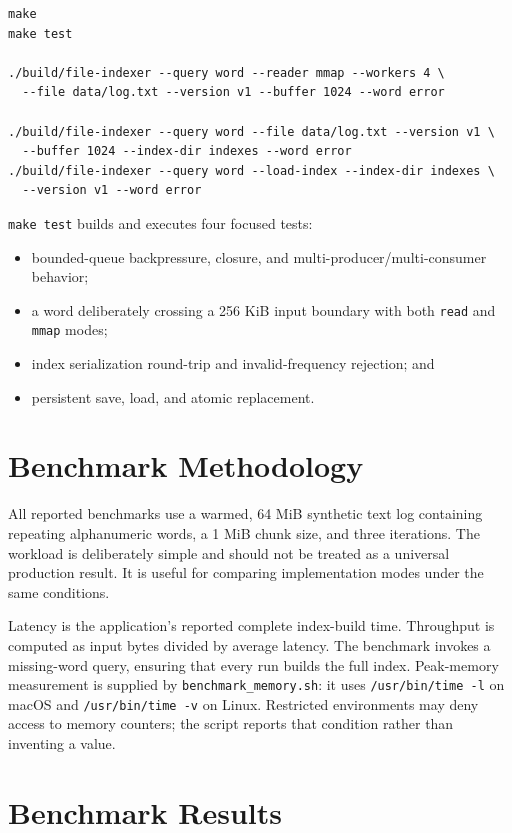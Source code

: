 \documentclass[11pt]{article}
\begin{document}
\begin{verbatim}
make
make test

./build/file-indexer --query word --reader mmap --workers 4 \
  --file data/log.txt --version v1 --buffer 1024 --word error

./build/file-indexer --query word --file data/log.txt --version v1 \
  --buffer 1024 --index-dir indexes --word error
./build/file-indexer --query word --load-index --index-dir indexes \
  --version v1 --word error
\end{verbatim}

\texttt{make test} builds and executes four focused tests:

\begin{itemize}[noitemsep]
  \item bounded-queue backpressure, closure, and multi-producer/multi-consumer
        behavior;
  \item a word deliberately crossing a 256 KiB input boundary with both
        \texttt{read} and \texttt{mmap} modes;
  \item index serialization round-trip and invalid-frequency rejection; and
  \item persistent save, load, and atomic replacement.
\end{itemize}

\section{Benchmark Methodology}

All reported benchmarks use a warmed, 64 MiB synthetic text log containing
repeating alphanumeric words, a 1 MiB chunk size, and three iterations. The
workload is deliberately simple and should not be treated as a universal
production result. It is useful for comparing implementation modes under the
same conditions.

Latency is the application's reported complete index-build time. Throughput is
computed as input bytes divided by average latency. The benchmark invokes a
missing-word query, ensuring that every run builds the full index. Peak-memory
measurement is supplied by \texttt{benchmark\_memory.sh}: it uses
\texttt{/usr/bin/time -l} on macOS and \texttt{/usr/bin/time -v} on Linux.
Restricted environments may deny access to memory counters; the script reports
that condition rather than inventing a value.

\section{Benchmark Results}
\end{document}
